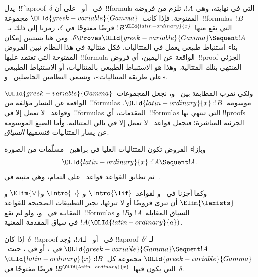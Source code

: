 \documentclass[../../../include/open-logic-section]{subfiles}
\begin{document}


يدل~!!^a{proof}~$\delta$ في~ أو~ على أن~!!{formula}
التي في نهايته، وهي~$!A$، تلزم من فروضه المفتوحة. فإذا كانت~$\OLId{greek-variable}{Gamma}$
مجموعة~!!{formula}s~$!B$ التي يقع منها~$!B^\OLId{latin-ordinary}{x}$ فرضًا مفتوحًا في~$\delta$،
رمزنا إلى ذلك بـ~$\delta \Proves \OLId{greek-variable}{Gamma} \Sequent !A$. ومن هنا يستبين
إمكان بناء استنباط طبيعي يعمل في المتتاليات. فكل متتالية في هذا النظام
تبين الفروض المفتوحة التي تعتمد عليها~!!{formula} الواقعة عن اليمين،
أي فروض~!!{proof} الجزئي المنتهي بتلك المتتالية. وهذا هو الاستنباط
الطبيعي بالمتتاليات، أو الاستنباط الطبيعي «على طريقة المتتاليات»،
ونسمي النظامين الحاصلين~ و.

ولكي تقرب المطابقة بين~ و، نجعل المجموعات~$\OLId{greek-variable}{Gamma}$
الواقعة عن اليسار مؤلفة من~!!{formula}s موسومة~$\OLId{latin-ordinary}{x}:!B$. وقواعد~
لا تعمل إلا في~!!{formula}s المقدمات، أي~!!{formula}s التي تنتهي بها
!!{proof}s الجزئية المباشرة؛ فنجعل قواعد~ لا تعمل إلا في تالي
المتتالية. وأما الصيغ الموسومة عن يسار المتتاليات فنسميها
\emph{السياق}.

وبإزاء الفروض تكون المتتاليات العليا في براهين~ مسلّمات من الصورة
\[\OLId{latin-ordinary}{x}:!A \Sequent !A.\]
ثم تطابق القواعد قواعد~ على التمام، وهي مثبتة في~.



وكما أجزنا في~ و لقواعد~$\Intro{\lif}$ و
$\Intro{\lnot}$ و$\Elim{\lor}$ و$\Elim{\lexists}$ أن تبرئ فروضًا أو
لا تبرئها، نجيز التطبيقات الصحيحة للقواعد المقابلة في~
و، ولو لم تقع~!!{formula}s السياق المقابلة~$!A$ و$!B$
و$!A(\OLId{latin-ordinary}{a})$ في سياق المقدمة المعنية.

\begin{prop}
إذا كان~$\delta$~!!a{proof} في~ أو~ لـ$!A$، وُجد
!!a{proof}~$\delta'$ لـ$\OLId{greek-variable}{Gamma} \Sequent !A$ في~، أو في
، حيث~$\OLId{greek-variable}{Gamma}$ مجموعة كل~$\OLId{latin-ordinary}{x}:!B$ التي يكون فيها~$!B^\OLId{latin-ordinary}{x}$ فرضًا
مفتوحًا في~$\delta$.
\end{prop}
\end{document}
